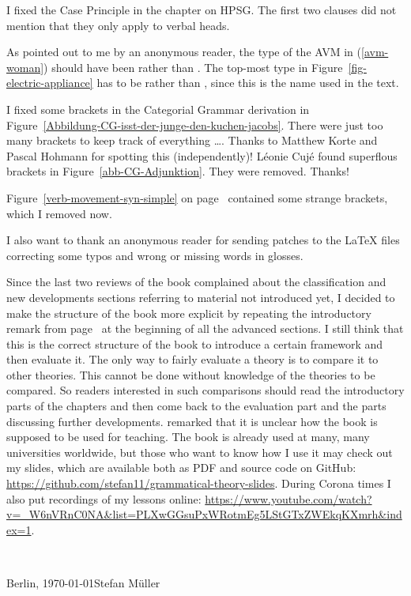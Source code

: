 I fixed the Case Principle in the chapter on HPSG. The first two clauses did not mention that they
only apply to verbal heads.

As pointed out to me by an anonymous reader, the type of the AVM in (\ref{avm-woman}) should have
been  rather than . The top-most type in Figure~\ref{fig-electric-appliance} has to be
 rather than , since this is the name used in the text.

I fixed some brackets in the Categorial Grammar derivation in Figure~\ref{Abbildung-CG-isst-der-junge-den-kuchen-jacobs}. There were
just too many brackets to keep track of everything \ldots. Thanks to Matthew Korte and Pascal
Hohmann for spotting this (independently)!
Léonie Cujé found superflous brackets in Figure~\ref{abb-CG-Adjunktion}. They were removed. Thanks!

Figure~\ref{verb-movement-syn-simple} on page~\pageref{verb-movement-syn-simple} contained some strange brackets, which I removed now.

I also want to thank an anonymous reader for sending patches to the \LaTeX{} files correcting some
typos and wrong or missing words in glosses.

Since the last two reviews of the book complained about the classification and new developments
sections referring to material not introduced yet, I decided to make the structure of the book more
explicit by repeating the introductory remark from page~\pageref{page:structure-of-book} at the
beginning of all the advanced sections. I still think that this is the correct structure of the book to introduce a
certain framework and then evaluate it. The only way to fairly evaluate a theory is to compare it to
other theories. This cannot be done without knowledge of the theories to be compared. So readers
interested in such comparisons should read the introductory parts of the chapters and then come back
to the evaluation part and the parts discussing further developments. \citet{Culicover2021a}
remarked that it is unclear how the book is supposed to be used for teaching. The book is already
used at many, many universities worldwide, but those who want to know how I use it may check out my
slides, which are available both as PDF and source code on GitHub:
\url{https://github.com/stefan11/grammatical-theory-slides}. During Corona times I also put
recordings of my lessons online: \url{https://www.youtube.com/watch?v=_W6nVRnC0NA&list=PLXwGGsuPxWRotmEg5LStGTxZWEkqKXmrh&index=1}.

~\medskip

\noindent
Berlin, \today\hfill Stefan Müller



